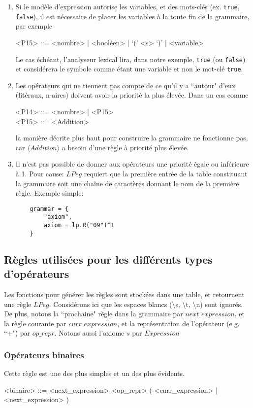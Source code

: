 \documentclass{article}
\begin{document}
\begin{enumerate}
	\item Si le modèle d'expression autorise les variables, et des mots-clés (ex. \lstinline|true|, \lstinline|false|), il est nécessaire de placer les variables à la toute fin de la grammaire, par exemple
	\begin{grammar}
<P15> ::= <nombre> | <booléen> | `(' <s> `)' | <variable>
	\end{grammar}
	Le cas échéant, l'analyseur lexical lira, dans notre exemple, \lstinline|true| (ou \lstinline|false|) et considérera le symbole comme étant une variable et non le mot-clé \lstinline|true|.
	\item Les opérateurs qui ne tiennent pas compte de ce qu'il y a ``autour" d'eux (litéraux, n-aires) doivent avoir la priorité la plus élevée. Dans un cas comme
	\begin{grammar}
<P14> ::= <nombre> | <P15>\\
<P15> ::= <Addition>
	\end{grammar}
	la manière décrite plus haut pour construire la grammaire ne fonctionne pas, car $\langle Addition \rangle$ a besoin d'une règle à priorité plus élevée.
	\item Il n'est pas possible de donner aux opérateurs une priorité égale ou inférieure à 1. Pour cause: $LPeg$ requiert que la première entrée de la table constituant la grammaire soit une chaîne de caractères donnant le nom de la première règle. Exemple simple:
	\begin{verbatim}
	grammar = {
		"axiom",
		axiom = lp.R("09")^1
	}
	\end{verbatim}
\end{enumerate}

\subsection{Règles utilisées pour les différents types d'opérateurs}
Les fonctions pour générer les règles sont stockées dans une table, et retournent une règle $LPeg$. Considérons ici que les espaces blancs (\textbackslash s, \textbackslash t, \textbackslash n) sont ignorés. De plus, notons la ``prochaine" règle dans la grammaire par $next\_expression$, et la règle courante par $curr\_expression$, et la représentation de l'opérateur (e.g. ``+") par $op\_repr$. Notons aussi l'axiome $s$ par $Expression$
\subsubsection{Opérateurs binaires}
Cette règle est une des plus simples et un des plus évidents.
\begin{grammar}
	<binaire> ::= <next\_expression> <op\_repr> ( <curr\_expression> | <next\_expression> )
\end{grammar}
\end{document}
